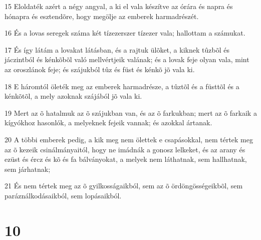 \par 15 Eloldaték azért a négy angyal, a ki el vala készítve az órára és napra és hónapra és esztendõre, hogy megölje az emberek harmadrészét.
\par 16 És a lovas seregek száma két tízezerszer tízezer vala; hallottam a számukat.
\par 17 És így látám a lovakat látásban, és a rajtuk ülõket, a kiknek tûzbõl és jáczintból és kénkõbõl való mellvértjeik valának; és a lovak feje olyan vala, mint az oroszlánok feje; és szájukból tûz és füst és kénkõ jõ vala ki.
\par 18 E háromtól öleték meg az emberek harmadrésze, a tûztõl és a füsttõl és a kénkõtõl, a mely azoknak szájából jõ vala ki.
\par 19 Mert az õ hatalmuk az õ szájukban van, és az õ farkukban; mert az õ farkaik a kígyókhoz hasonlók, a melyeknek fejeik vannak; és azokkal ártanak.
\par 20 A többi emberek pedig, a kik meg nem ölettek e csapásokkal, nem tértek meg az õ kezeik csinálmányaitól, hogy ne imádnák a gonosz lelkeket, és az arany és ezüst és ércz és kõ és fa bálványokat, a melyek nem láthatnak, sem hallhatnak, sem járhatnak;
\par 21 És nem tértek meg az õ gyilkosságaikból, sem az õ ördöngösségeikbõl, sem paráználkodásaikból, sem lopásaikból.

\chapter{10}

